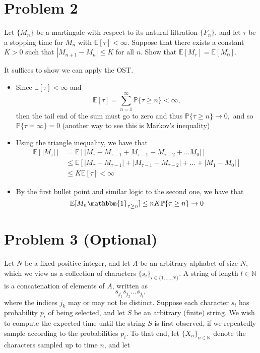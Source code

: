 \documentclass[11pt]{article}
\newcommand{\bbE}{\mathbb{E}}
\newcommand{\bbP}{\mathbb{P}}
\begin{document}
\section*{Problem 2}
Let \(\{M_n\}\) be a martingale with respect to its natural filtration \(\{F_n\}\), and let \(\tau\) be a stopping time for \(M_n\) with \(\mathbb{E}[\tau] < \infty\). Suppose that there exists a constant \(K > 0\) such that \(|M_{n+1} - M_n| \leq K\) for all \(n\). Show that \(\mathbb{E}[M_\tau] = \mathbb{E}[M_0]\).
\begin{solution}
    It suffices to show we can apply the OST.
    \begin{itemize}
    \item Since $\bbE[\tau] < \infty$ and 
    \[\bbE[\tau] = \sum_{n=1}^\infty \bbP\{\tau \geq n\} < \infty,\] then the tail end of the sum must go to zero and thus $\bbP\{\tau \geq n\} \to 0,$ and so $\bbP\{\tau = \infty\} = 0$ (another way to see this is Markov's inequality)
    \item Using the triangle inequality, we have that 
    \begin{align*}
        \bbE[|M_\tau|] &= \bbE[|M_\tau - M_{\tau -1} + M_{\tau - 1} - M_{\tau - 2} + \dots M_0|]\\
        &\leq \bbE[|M_\tau -M_{\tau -1}| + |M_{\tau - 1} - M_{\tau - 2}| + \dots + |M_1 - M_0|]\\
        &\leq K\bbE[\tau] < \infty
    \end{align*} 
    \item By the first bullet point and similar logic to the second one, we have that 
    \[\bbE[M_n \mathbbm{1}_{\tau \geq n}] \leq nK\bbP\{\tau \geq n\}\to 0\]
    \end{itemize}
\end{solution}

\newpage

\section*{Problem 3 (Optional)}
Let \(N\) be a fixed positive integer, and let \(A\) be an arbitrary alphabet of size \(N\), which we view as a collection of characters \(\{s_i\}_{i \in \{1, \ldots, N\}}\). A string of length \(l \in \mathbb{N}\) is a concatenation of elements of \(A\), written as
\[
s_{j_1} s_{j_2} \ldots s_{j_l},
\]
where the indices \(j_k\) may or may not be distinct. Suppose each character \(s_i\) has probability \(p_i\) of being selected, and let \(S\) be an arbitrary (finite) string. We wish to compute the expected time until the string \(S\) is first observed, if we repeatedly sample according to the probabilities \(p_i\). To that end, let \(\{X_n\}_{n \in \mathbb{N}}\) denote the characters sampled up to time \(n\), and let
\end{document}
